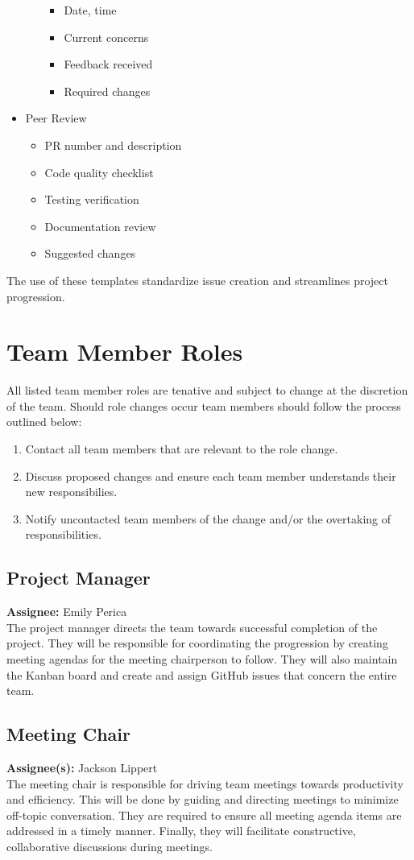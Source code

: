 \documentclass{article}
\begin{document}
\begin{itemize}
\begin{itemize}
\begin{itemize}
        \item Date, time
        \item Current concerns
        \item Feedback received
        \item Required changes
      \end{itemize}
  \end{itemize}
  \item Peer Review
  \begin{itemize}
    \item PR number and description
    \item Code quality checklist
    \item Testing verification
    \item Documentation review
    \item Suggested changes
  \end{itemize}
\end{itemize}
The use of these templates standardize issue creation and streamlines project progression.


\section{Team Member Roles}
All listed team member roles are tenative and subject to change at the discretion of the team. Should role changes occur
team members should follow the process outlined below: 
\begin{enumerate}
  \item Contact all team members that are relevant to the role change.
  \item Discuss proposed changes and ensure each team member understands their new responsibilies.
  \item Notify uncontacted team members of the change and/or the overtaking of responsibilities. 
\end{enumerate}
\subsection{Project Manager}
\textbf{Assignee:} Emily Perica\\
The project manager directs the team towards successful completion of the project. 
They will be responsible for coordinating the progression by creating meeting agendas for the meeting chairperson 
to follow. They will also maintain the Kanban board and create and assign GitHub issues that concern the entire team.
\subsection{Meeting Chair}
\textbf{Assignee(s):} Jackson Lippert\\
The meeting chair is responsible for driving team meetings towards productivity and efficiency. 
This will be done by guiding and directing meetings to minimize off-topic conversation. They are required to ensure all 
meeting agenda items are addressed in a timely manner. Finally, they will facilitate constructive, collaborative
discussions during meetings.
\end{document}
